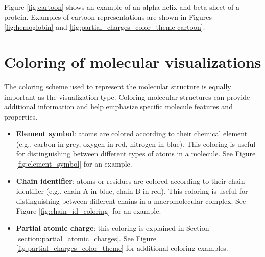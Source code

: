 \documentclass[
  digital,     %
  oneside,     %
  nosansbold,  %
  nocolorbold, %
  lof,         %
  lot,         %
]{fithesis4}
\begin{document}
Figure \ref{fig:cartoon} shows an example of an alpha helix and beta sheet of a protein. Examples of cartoon representations are shown in Figures \ref{fig:hemoglobin} and \ref{fig:partial_charges_color_theme-cartoon}.

\section{Coloring of molecular visualizations}
\label{subsection:coloring_of_molecular_visualizations}

The coloring scheme used to represent the molecular structure is equally important as the visualization type. Coloring molecular structures can provide additional information and help emphasize specific molecule features and properties.

\begin{itemize}
  \item \textbf{Element symbol}: atoms are colored according to their chemical element (e.g., carbon in grey, oxygen in red, nitrogen in blue). This coloring is useful for distinguishing between different types of atoms in a molecule. See Figure \ref{fig:element_symbol} for an example.
  \item \textbf{Chain identifier}: atoms or residues are colored according to their chain identifier (e.g., chain A in blue, chain B in red). This coloring is useful for distinguishing between different chains in a macromolecular complex. See Figure \ref{fig:chain_id_coloring} for an example.
  \item \textbf{Partial atomic charge}: this coloring is explained in Section \ref{section:partial_atomic_charges}. See Figure \ref{fig:partial_charges_color_theme} for additional coloring examples.
\end{itemize}
\end{document}
